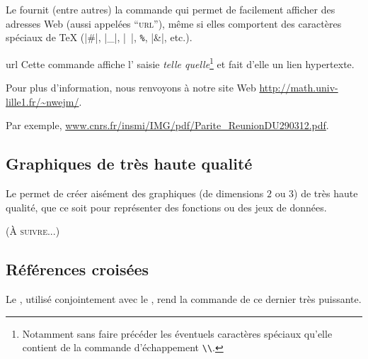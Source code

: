 Le  fournit (entre autres) la commande  qui permet
de facilement afficher des adresses Web (aussi appelées \enquote{\textsc{url}}),
même si elles comportent des caractères spéciaux de \TeX{} (|#|, |_|, |~|,
\lstinline[commentstyle={}]+%+, |&|, etc.).

\begin{docCommand}{url}{}
  Cette commande affiche l' saisie \emph{telle
    quelle}\footnote{Notamment sans faire précéder les éventuels caractères
    spéciaux qu'elle contient de la commande d'échappement
    \protect\lstinline+\\+.} et fait d'elle un lien hypertexte.
\begin{bodycode}[listing and text,listing options={deletekeywords={[2]url,math}}]
Pour plus d'information, nous renvoyons à notre site Web
\url{http://math.univ-lille1.fr/~nwejm/}.
\end{bodycode}
\begin{bodycode}[listing and text,listing options={deletekeywords={[2]url,[1]exemple}}]
Par exemple, \url{www.cnrs.fr/insmi/IMG/pdf/Parite_ReunionDU290312.pdf}.
\end{bodycode}
\end{docCommand}

\subsection{Graphiques de très haute qualité}
\label{sec:graphiques-de-tres}

Le  permet de créer aisément des graphiques (de dimensions
$2$ ou $3$) de très haute qualité, que ce soit pour représenter des fonctions ou
des jeux de données.

(\textsc{À suivre...})

\subsection{Références croisées}
\label{sec:references-croisees}

Le , utilisé conjointement avec le , rend la
commande  de ce dernier très puissante.

